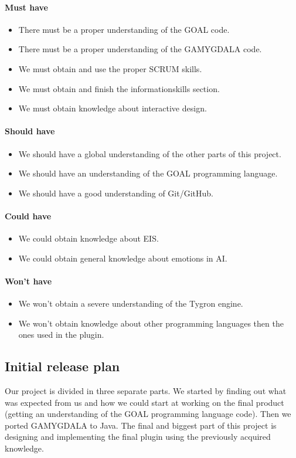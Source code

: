 \paragraph{Must have} 
\begin{itemize}
\item There must be a proper understanding of the GOAL code.
\item There must be a proper understanding of the GAMYGDALA code.
\item We must obtain and use the proper SCRUM skills.
\item We must obtain and finish the informationskills section.
\item We must obtain knowledge about interactive design.
\end{itemize}

\paragraph{Should have} 
\begin{itemize}
\item We should have a global understanding of the other parts of this project.
\item We should have an understanding of the GOAL programming language.
\item We should have a good understanding of Git/GitHub.
\end{itemize}

\paragraph{Could have} 
\begin{itemize}
\item We could obtain knowledge about EIS.
\item We could obtain general knowledge about emotions in AI.
\end{itemize}

\paragraph{Won't have} 
\begin{itemize}
\item We won't obtain a severe understanding of the Tygron engine.
\item We won't obtain knowledge about other programming languages then the ones used in the plugin.
\end{itemize}

\subsection{Initial release plan}
Our project is divided in three separate parts. We started by finding out what was expected from us and how we could start at working on the final product (getting an understanding of the GOAL programming language code). Then we ported GAMYGDALA to Java. The final and biggest part of this project is designing and implementing the final plugin using the previously acquired knowledge.